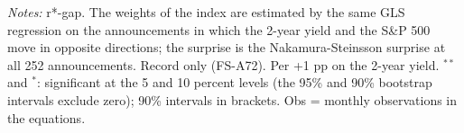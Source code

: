 \begin{flushleft}\footnotesize\textit{Notes:} r*-gap. The weights of the index are estimated by the same GLS regression on the announcements in which the 2-year yield and the S\&P 500 move in opposite directions; the surprise is the Nakamura-Steinsson surprise at all 252 announcements. Record only (FS-A72). Per +1 pp on the 2-year yield. $^{**}$ and $^{*}$: significant at the 5 and 10 percent levels (the 95\% and 90\% bootstrap intervals exclude zero); 90\% intervals in brackets. Obs = monthly observations in the equations.\end{flushleft}
\endgroup
